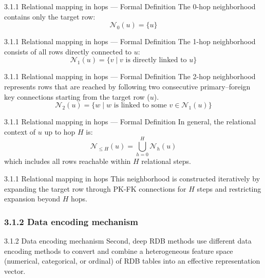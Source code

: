 \documentclass[aspectratio=169,10pt]{beamer}
\begin{document}
\begin{frame}{3.1.1 Relational mapping in hops --- Formal Definition}
The 0-hop neighborhood contains only the target row:
\begin{equation*}
\mathcal{N}_0(u) = \{u\}
\end{equation*}
\end{frame}

\begin{frame}{3.1.1 Relational mapping in hops --- Formal Definition}
The 1-hop neighborhood consists of all rows directly connected to $u$:
\begin{equation*}
\mathcal{N}_1(u) = \{ v \mid v \text{ is directly linked to } u \}
\end{equation*}
\end{frame}

\begin{frame}{3.1.1 Relational mapping in hops --- Formal Definition}
The 2-hop neighborhood represents rows that are reached by following two consecutive primary--foreign key connections starting from the target row ($u$).
\begin{equation*}
\mathcal{N}_2(u) = \{ w \mid w \text{ is linked to some } v \in \mathcal{N}_1(u) \}
\end{equation*}
\end{frame}

\begin{frame}{3.1.1 Relational mapping in hops --- Formal Definition}
In general, the relational context of $u$ up to hop $H$ is:
\begin{equation*}
\mathcal{N}_{\le H}(u) = \bigcup_{h=0}^{H} \mathcal{N}_h(u)
\end{equation*}
which includes all rows reachable within $H$ relational steps.
\end{frame}

\begin{frame}{3.1.1 Relational mapping in hops}
This neighborhood is constructed iteratively by expanding the target row through PK-FK connections for $H$ steps and restricting expansion beyond $H$ hops.
\end{frame}

\subsubsection{3.1.2 Data encoding mechanism}

\begin{frame}{3.1.2 Data encoding mechanism}
Second, deep RDB methods use different data encoding methods to convert and combine a heterogeneous feature space (numerical, categorical, or ordinal) of RDB tables into an effective representation vector.
\end{frame}
\end{document}
